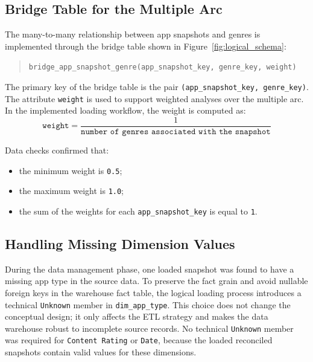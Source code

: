 \documentclass[11pt,a4paper]{article}
\begin{document}
\subsection{Bridge Table for the Multiple Arc}

The many-to-many relationship between app snapshots and genres is implemented through the bridge table shown in Figure~\ref{fig:logical_schema}:
\begin{quote}
\texttt{bridge\_app\_snapshot\_genre(app\_snapshot\_key, genre\_key, weight)}
\end{quote}

The primary key of the bridge table is the pair \texttt{(app\_snapshot\_key, genre\_key)}. The attribute \texttt{weight} is used to support weighted analyses over the multiple arc. In the implemented loading workflow, the weight is computed as:
\[
\texttt{weight} = \frac{1}{\texttt{number of genres associated with the snapshot}}
\]

Data checks confirmed that:
\begin{itemize}[leftmargin=1.5em]
    \item the minimum weight is \texttt{0.5};
    \item the maximum weight is \texttt{1.0};
    \item the sum of the weights for each \texttt{app\_snapshot\_key} is equal to \texttt{1}.
\end{itemize}

\subsection{Handling Missing Dimension Values}
During the data management phase, one loaded snapshot was found to have a missing app type in the source data. To preserve the fact grain and avoid nullable foreign keys in the warehouse fact table, the logical loading process introduces a technical \texttt{Unknown} member in \texttt{dim\_app\_type}. This choice does not change the conceptual design; it only affects the ETL strategy and makes the data warehouse robust to incomplete source records. No technical \texttt{Unknown} member was required for \texttt{Content Rating} or \texttt{Date}, because the loaded reconciled snapshots contain valid values for these dimensions.
\end{document}
